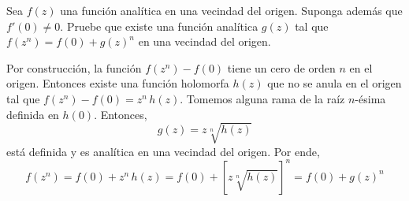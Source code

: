 \begin{exercise}
Sea $f(z)$ una función analítica en una vecindad del origen. Suponga además que $f'(0) \ne 0$. Pruebe que existe una función analítica $g(z)$ tal que $f(z^n) = f(0) + g(z)^n$ en una vecindad del origen.
\end{exercise}

\begin{solution}
Por construcción, la función $f(z^n) - f(0)$ tiene un cero de orden $n$ en el origen. Entonces existe una función holomorfa $h(z)$ que no se anula en el origen tal que $f(z^n) - f(0) = z^n \, h(z)$. Tomemos alguna rama de la raíz $n$-ésima definida en $h(0)$. Entonces,
$$g(z) = z \sqrt [n] {h(z)}$$
está definida y es analítica en una vecindad del origen. Por ende,
$$f(z^n) = f(0) + z^n \, h(z) = f(0) + \left[ z \sqrt [n] {h(z)} \right]^n = f(0) + g(z)^n$$
\end{solution}
